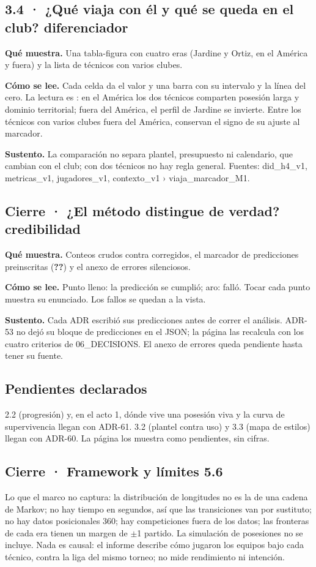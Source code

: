 \documentclass[11pt,a4paper]{article}
\newcommand{\cifraMarcador}{\textbf{??}}\newcommand{\cifraFirmaCru}{\textbf{??}}%
\newcommand{\nivel}[1]{\fbox{\footnotesize\textbf{#1}}}
\newcommand{\fuente}[1]{{\small\ttfamily #1}}
\newcommand{\bloque}[3]{\par\textbf{Qué muestra.} #1\par\textbf{Cómo se lee.} #2\par\textbf{Sustento.} #3\par}
\begin{document}
\subsection*{3.4 · ¿Qué viaja con él y qué se queda en el club? \hfill{\normalfont\small diferenciador}}
\bloque{Una tabla-figura con cuatro eras (Jardine y Ortiz, en el América y fuera)
y la lista de técnicos con varios clubes.}
{Cada celda da el valor y una barra con su intervalo y la línea del cero. La
lectura es \nivel{C}: en el América los dos técnicos comparten posesión larga y
dominio territorial; fuera del América, el perfil de Jardine se invierte. Entre
los técnicos con varios clubes fuera del América, \cifraViajan{} conservan el
signo de su ajuste al marcador.}
{La comparación no separa plantel, presupuesto ni calendario, que cambian con
el club; con dos técnicos no hay regla general. Fuentes: \fuente{did\_h4\_v1},
\fuente{metricas\_v1}, \fuente{jugadores\_v1}, \fuente{contexto\_v1 ›
viaja\_marcador\_M1}.}

\subsection*{Cierre · ¿El método distingue de verdad? \hfill{\normalfont\small credibilidad}}
\bloque{Conteos crudos contra corregidos, el marcador de predicciones
preinscritas (\cifraMarcador) y el anexo de errores silenciosos.}
{Punto lleno: la predicción se cumplió; aro: falló. Tocar cada punto muestra su
enunciado. Los fallos se quedan a la vista.}
{Cada ADR escribió sus predicciones antes de correr el análisis. ADR-53 no dejó
su bloque de predicciones en el JSON; la página las recalcula con los cuatro
criterios de 06\_DECISIONS. El anexo de errores queda pendiente hasta tener su
fuente.}

\subsection*{Pendientes declarados}
2.2 (progresión) y, en el acto 1, dónde vive una posesión viva y la curva de
supervivencia llegan con ADR-61. 3.2 (plantel contra uso) y 3.3 (mapa de
estilos) llegan con ADR-60. La página los muestra como pendientes, sin cifras.

\subsection*{Cierre · Framework y límites \hfill{\normalfont\small 5.6}}
Lo que el marco no captura: la distribución de longitudes no es la de una
cadena de Markov; no hay tiempo en segundos, así que las transiciones van por
sustituto; no hay datos posicionales 360; hay competiciones fuera de los datos;
las fronteras de cada era tienen un margen de $\pm$1 partido. La simulación de
posesiones no se incluye. Nada es causal: el informe describe cómo jugaron los
equipos bajo cada técnico, contra la liga del mismo torneo; no mide
rendimiento ni intención.
\end{document}
